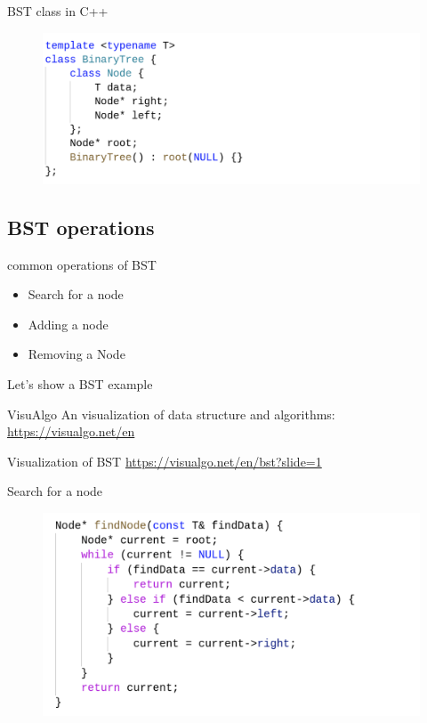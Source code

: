 \documentclass[aspectratio=169]{beamer}
\begin{document}
\begin{frame}{BST class in C++}
        \begin{figure}
            \includegraphics[width=\textwidth]{BST_class.png}
    \end{figure}
\end{frame}

\subsection{BST operations}
\begin{frame}{common operations of BST}
    \begin{itemize}
        \item Search for a node
        \item Adding a node 
        \item Removing a Node
    \end{itemize}
\end{frame}

\begin{frame}{Let's show a BST example}
    \begin{block}{VisuAlgo}
         An visualization of data structure and algorithms: \url{https://visualgo.net/en}
    \end{block}
    \begin{block}{Visualization of BST}
        \url{https://visualgo.net/en/bst?slide=1}
    \end{block}
\end{frame}

\begin{frame}{Search for a node}
        \begin{figure}
            \includegraphics[width=\textwidth]{BST_find.png}
    \end{figure}
\end{frame}
\end{document}
